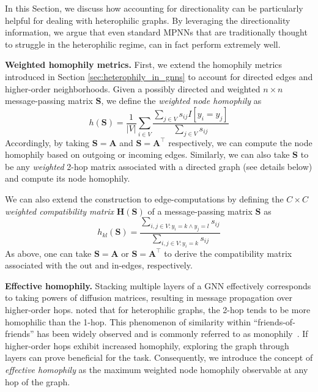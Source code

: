 \documentclass{article}
\theoremstyle{plain}
\theoremstyle{definition}
\theoremstyle{remark}
\begin{document}
In this Section, we discuss how accounting for directionality can be particularly helpful for dealing with heterophilic graphs. By leveraging the directionality information, we argue that even standard MPNNs that are traditionally thought to struggle in the heterophilic regime, can in fact perform extremely well. 

\textbf{Weighted homophily metrics.} First, we extend the homophily metrics introduced in Section \ref{sec:heterophily_in_gnns} to account for  directed edges and higher-order neighborhoods. 
Given a possibly directed and weighted $n\times n$ message-passing matrix $\mathbf{S}$, we define the \textit{weighted node homophily} as
\begin{equation}
h(\mathbf{S}) = \frac{1}{|V|} \sum_{i \in V} \frac{\sum_{j \in V} s_{ij}  I[y_i = y_j]}{\sum_{j \in V} s_{ij}}
\end{equation}
\noindent Accordingly, by taking $\mathbf{S} = \mathbf{A}$ and $\mathbf{S} = \mathbf{A}^\top$ respectively, we can compute the node homophily based on outgoing or incoming edges. Similarly, we can also take $\mathbf{S}$ to be any {\em weighted} 2-hop matrix associated with a directed graph (see details below) and compute its node homophily. 

We can also extend the construction to edge-computations by defining the $C\times C$ \textit{weighted compatibility matrix} $\mathbf{H}(\mathbf{S})$ of a message-passing matrix $\mathbf{S}$ as 
\begin{equation}
h_{kl}(\mathbf{S}) = \frac{\sum_{i,j \in V : y_i=k \land y_j=l} s_{ij}}{\sum_{i,j \in V  : y_i=k} s_{ij}}
\end{equation}
\noindent As above, one can take $\mathbf{S} = \mathbf{A}$ or $\mathbf{S} = \mathbf{A}^\top$ to derive the compatibility matrix associated with the out and in-edges, respectively.

\textbf{Effective homophily.} Stacking multiple layers of a GNN effectively corresponds to taking powers of diffusion matrices, resulting in message propagation over higher-order hops. \citet{zhu2020beyond} noted that for heterophilic graphs, the 2-hop tends to be more homophilic than the 1-hop. This phenomenon of similarity within ``friends-of-friends'' has been widely observed and is commonly referred to as monophily~\cite{monophily}. If higher-order hops exhibit increased homophily, exploring the graph through layers can prove beneficial for the task. Consequently, we introduce the concept of \textit{effective homophily} as the maximum weighted node homophily observable at any hop of the graph.
\end{document}
